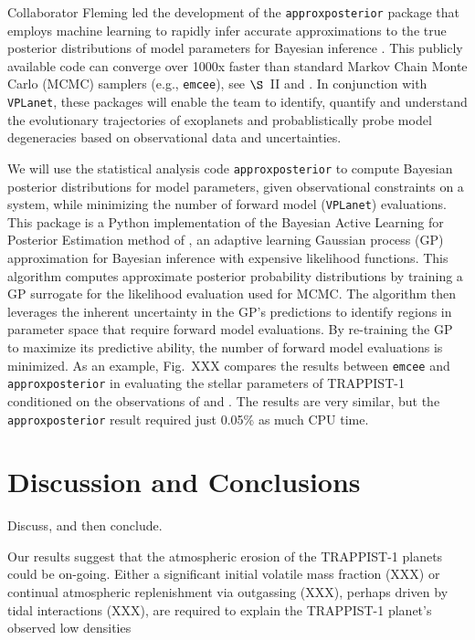 \documentclass[twocolumn]{aastex62}
\newcommand{\vplanet}[0]{\texttt{VPLanet}\xspace}
\newcommand{\emcee}[0]{\texttt{emcee}\xspace}
\newcommand{\approxposterior}[0]{\texttt{approxposterior}\xspace}
\begin{document}
Collaborator Fleming led the development of the \approxposterior package that employs machine learning to rapidly infer accurate approximations to the true posterior distributions of model parameters for Bayesian inference \cite[][Fleming et al., in prep]{FlemingVanDerPlas18}. This publicly available code can converge over 1000x faster than standard Markov Chain Monte Carlo (MCMC) samplers (e.g., \emcee \citealp{ForemanMackey13}), see $\S$~II and \cite{FlemingBarnes19}. In conjunction with \vplanet, these packages will enable the team to identify, quantify and understand the evolutionary trajectories of exoplanets and probablistically probe model degeneracies based on observational data and uncertainties.

We will use the statistical analysis code \approxposterior to compute Bayesian posterior distributions for model parameters, given observational constraints on a system, while minimizing the number of forward model (\vplanet) evaluations. This package is a Python implementation of the Bayesian Active Learning for Posterior Estimation method of \cite{Kandasamy15}, an adaptive learning Gaussian process (GP) approximation for Bayesian inference with expensive likelihood functions. This algorithm computes approximate posterior probability distributions by training a GP surrogate for the likelihood evaluation used for MCMC. The algorithm then leverages the inherent uncertainty in the GP's predictions to identify regions in parameter space that require forward model evaluations. By re-training the GP to maximize its predictive ability, the number of forward model evaluations is minimized. As an example, Fig.~XXX compares the results between \emcee and \approxposterior in evaluating the stellar parameters of TRAPPIST-1 conditioned on the observations of \citet{Grimm18} and \citet{Wheatley17}. The results are very similar, but the \approxposterior result required just 0.05\% as much CPU time.



\section{Discussion and Conclusions} \label{sec:discussion}

Discuss, and then conclude.

Our results suggest that the atmospheric erosion of the TRAPPIST-1 planets could be on-going. Either a significant initial volatile mass fraction (XXX) or continual atmospheric replenishment via outgassing (XXX), perhaps driven by tidal interactions (XXX), are required to explain the TRAPPIST-1 planet's observed low densities \citep{Grimm2018}
\end{document}
